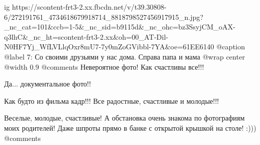  
 
 
 
 

\ifcmt
  ig https://scontent-frt3-2.xx.fbcdn.net/v/t39.30808-6/272191761_4734618679918714_8818798527456917915_n.jpg?_nc_cat=101&ccb=1-5&_nc_sid=b9115d&_nc_ohc=bz3SsyjCM_oAX-q3lhC&_nc_ht=scontent-frt3-2.xx&oh=00_AT-Dil-N0HF7Yj_WfLVLlqOxr8mU7-7y0mZoGVibbl-7YA&oe=61EE6140
  @caption @label 7: Со своими друзьями у нас дома. Справа папа и мама
	@wrap center
	@width 0.9
	@comments%
Невероятное фото! Как счастливы все!!!

Да... документальное фото!!

Как будто из фильма кадр!!! Все радостные, счастливые и молодые!!!

Веселые, молодые, счастливые! А обстановка очень знакома по фотографиям моих родителей! Даже шпроты прямо в банке с открытой крышкой на столе! :)))
	@comments%
\fi
